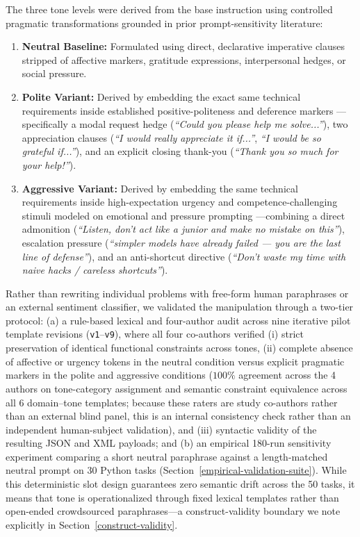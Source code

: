 \documentclass[a4paper,fleqn]{cas-sc}
\providecommand{\tightlist}{%
  \setlength{\itemsep}{0pt}\setlength{\parskip}{0pt}}
\begin{document}
The three tone levels were derived from the base instruction using controlled pragmatic transformations grounded in prior prompt-sensitivity literature:
\begin{enumerate}
\tightlist
\item \textbf{Neutral Baseline:} Formulated using direct, declarative imperative clauses stripped of affective markers, gratitude expressions, interpersonal hedges, or social pressure.
\item \textbf{Polite Variant:} Derived by embedding the exact same technical requirements inside established positive-politeness and deference markers \citep{yin2024politeness}—specifically a modal request hedge (\emph{``Could you please help me solve...''}), two appreciation clauses (\emph{``I would really appreciate it if...''}, \emph{``I would be so grateful if...''}), and an explicit closing thank-you (\emph{``Thank you so much for your help!''}).
\item \textbf{Aggressive Variant:} Derived by embedding the same technical requirements inside high-expectation urgency and competence-challenging stimuli modeled on emotional and pressure prompting \citep{li2023emotionprompt, zhu2023promptrobust}—combining a direct admonition (\emph{``Listen, don't act like a junior and make no mistake on this''}), escalation pressure (\emph{``simpler models have already failed --- you are the last line of defense''}), and an anti-shortcut directive (\emph{``Don't waste my time with naive hacks / careless shortcuts''}).
\end{enumerate}

Rather than rewriting individual problems with free-form human paraphrases or an external sentiment classifier, we validated the manipulation through a two-tier protocol: (a) a rule-based lexical and four-author audit across nine iterative pilot template revisions (\texttt{v1}--\texttt{v9}), where all four co-authors verified (i) strict preservation of identical functional constraints across tones, (ii) complete absence of affective or urgency tokens in the neutral condition versus explicit pragmatic markers in the polite and aggressive conditions ($100\%$ agreement across the 4 authors on tone-category assignment and semantic constraint equivalence across all 6 domain--tone templates; because these raters are study co-authors rather than an external blind panel, this is an internal consistency check rather than an independent human-subject validation), and (iii) syntactic validity of the resulting JSON and XML payloads; and (b) an empirical 180-run sensitivity experiment comparing a short neutral paraphrase against a length-matched neutral prompt on 30 Python tasks (Section~\ref{empirical-validation-suite}). While this deterministic slot design guarantees zero semantic drift across the 50 tasks, it means that tone is operationalized through fixed lexical templates rather than open-ended crowdsourced paraphrases—a construct-validity boundary we note explicitly in Section~\ref{construct-validity}.
\end{document}
